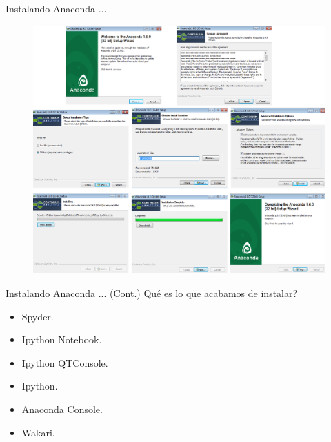 \documentclass[xcolor=dvipsnames]{beamer}
\begin{document}
\begin{frame}[fragile]{Instalando Anaconda ...}
	 \begin{figure}[h]
		\includegraphics[scale = 0.22]{Imagenes/instalacion.png}
\end{figure}
\end{frame}
\begin{frame}{Instalando Anaconda ... (Cont.)}
Qué es lo que acabamos de instalar?
\begin{itemize}
	\item Spyder.
	\item Ipython Notebook.
	\item Ipython QTConsole.
	\item Ipython.
	\item Anaconda Console.
	\item Wakari.
\end{itemize}
\end{frame}
\end{document}
